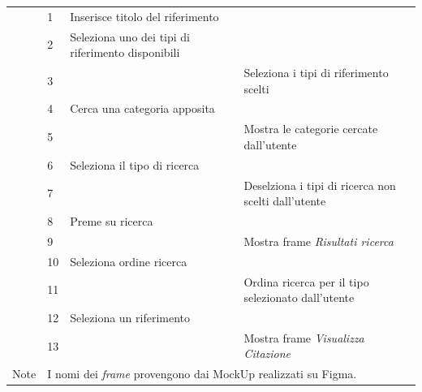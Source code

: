 \begin{table}[H]
\begin{tabularx}{\linewidth}{|l|X|X|X|}
  \cline{2-4} &  1 & Inserisce titolo del riferimento & \\
  \cline{2-4} &  2 & Seleziona uno dei \gls{tipi di riferimento} disponibili & \\
  \cline{2-4} &  3 &  & Seleziona i tipi di riferimento scelti \\
  \cline{2-4} &  4 & Cerca una categoria apposita &  \\
  \cline{2-4} &  5 &  & Mostra le categorie cercate dall'utente \\
  \cline{2-4} &  6 & Seleziona il \gls{tipo di ricerca} & \\
  \cline{2-4} &  7 & & Deselziona i tipi di ricerca non scelti dall'utente \\
  \cline{2-4} &  8 & Preme su ricerca & \\
  \cline{2-4} &  9 &  & Mostra frame \textit{Risultati ricerca} \\
  \cline{2-4} &  10 & Seleziona ordine ricerca & \\
  \cline{2-4} &  11 &  & Ordina ricerca per il tipo selezionato dall'utente \\
  \cline{2-4} &  12 & Seleziona un riferimento & \\
  \cline{2-4} &  13 &  & Mostra frame \textit{Visualizza Citazione}\\
   \hline Note & \multicolumn{3}{l|}{I nomi dei \textit{frame} provengono dai MockUp realizzati su Figma.} \\
 \hline

    \end{tabularx}
    \end{table}
    
    \newpage
    
